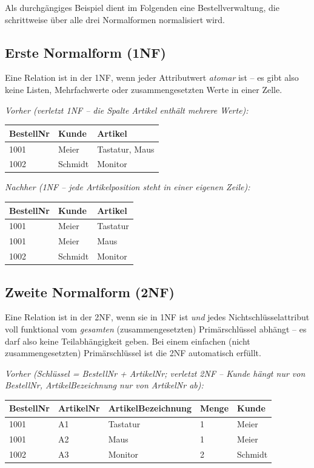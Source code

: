 Als durchgängiges Beispiel dient im Folgenden eine Bestellverwaltung, die schrittweise über alle drei Normalformen normalisiert wird.

\subsection{Erste Normalform (1NF)}
Eine Relation ist in der 1NF, wenn jeder Attributwert \emph{atomar} ist -- es gibt also keine Listen, Mehrfachwerte oder zusammengesetzten Werte in einer Zelle.

\textit{Vorher (verletzt 1NF -- die Spalte Artikel enthält mehrere Werte):}
\begin{center}
\begin{tabularx}{\textwidth}{l l X}
  \toprule
  \textbf{BestellNr} & \textbf{Kunde} & \textbf{Artikel} \\
  \midrule
  1001 & Meier & Tastatur, Maus \\
  1002 & Schmidt & Monitor \\
  \bottomrule
\end{tabularx}
\end{center}

\textit{Nachher (1NF -- jede Artikelposition steht in einer eigenen Zeile):}
\begin{center}
\begin{tabularx}{\textwidth}{l l X}
  \toprule
  \textbf{BestellNr} & \textbf{Kunde} & \textbf{Artikel} \\
  \midrule
  1001 & Meier & Tastatur \\
  1001 & Meier & Maus \\
  1002 & Schmidt & Monitor \\
  \bottomrule
\end{tabularx}
\end{center}

\subsection{Zweite Normalform (2NF)}
Eine Relation ist in der 2NF, wenn sie in 1NF ist \emph{und} jedes Nichtschlüsselattribut voll funktional vom \emph{gesamten} (zusammengesetzten) Primärschlüssel abhängt -- es darf also keine Teilabhängigkeit geben. Bei einem einfachen (nicht zusammengesetzten) Primärschlüssel ist die 2NF automatisch erfüllt.

\textit{Vorher (Schlüssel = BestellNr + ArtikelNr; verletzt 2NF -- Kunde hängt nur von BestellNr, ArtikelBezeichnung nur von ArtikelNr ab):}
\begin{center}
\begin{tabularx}{\textwidth}{l l X l l}
  \toprule
  \textbf{BestellNr} & \textbf{ArtikelNr} & \textbf{ArtikelBezeichnung} & \textbf{Menge} & \textbf{Kunde} \\
  \midrule
  1001 & A1 & Tastatur & 1 & Meier \\
  1001 & A2 & Maus & 1 & Meier \\
  1002 & A3 & Monitor & 2 & Schmidt \\
  \bottomrule
\end{tabularx}
\end{center}

